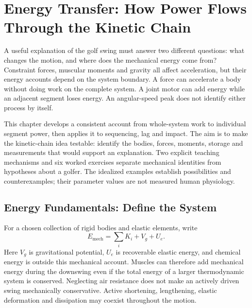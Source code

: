 \chapter[Energy Transfer: How Power Flows Through the Kinetic Chain]{Energy Transfer: How Power Flows\\Through the Kinetic Chain}
\label{ch:energy_transfer}

A useful explanation of the golf swing must answer two different questions:
what changes the motion, and where does the mechanical energy come from?
Constraint forces, muscular moments and gravity all affect acceleration, but
their energy accounts depend on the system boundary. A force can accelerate a
body without doing work on the complete system. A joint motor can add energy
while an adjacent segment loses energy. An angular-speed peak does not identify
either process by itself.

This chapter develops a consistent account from whole-system work to individual
segment power, then applies it to sequencing, lag and impact. The aim is to make
the kinetic-chain idea testable: identify the bodies, forces, moments, storage
and measurements that would support an explanation. Two explicit teaching
mechanisms and six worked exercises separate mechanical identities from
hypotheses about a golfer. The idealized examples establish possibilities and
counterexamples; their parameter values are not measured human physiology.

\section{Energy Fundamentals: Define the System}
\label{sec:energy_fundamentals}

For a chosen collection of rigid bodies and elastic elements, write
\begin{equation}
E_{\mathrm{mech}}=\sum_i K_i+V_g+U_e.
\label{eq:total_energy}
\end{equation}
Here $V_g$ is gravitational potential, $U_e$ is recoverable elastic energy, and
chemical energy is outside this mechanical account. Muscles can therefore add
mechanical energy during the downswing even if the total energy of a larger
thermodynamic system is conserved. Neglecting air resistance does not make an
actively driven swing mechanically conservative. Active shortening, lengthening,
elastic deformation and dissipation may coexist throughout the motion.


